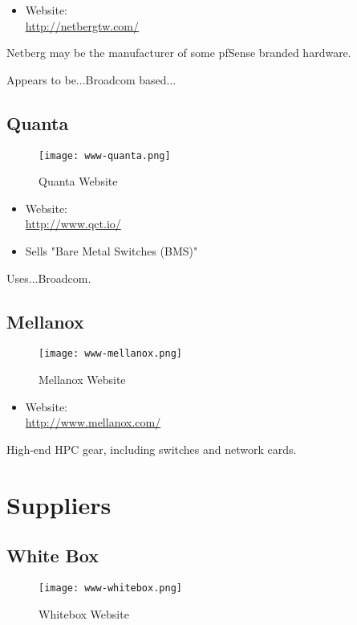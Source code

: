\begin{itemize}
 \item Website: \\ \url{http://netbergtw.com/}
\end{itemize}


Netberg may be the manufacturer of some pfSense branded hardware.


Appears to be...Broadcom based...


\subsection{Quanta}
\begin{figure}[h!]
\texttt{[image: www-quanta.png]}
 \caption{Quanta Website}
 \label{fig:www-quanta}
\end{figure}


\begin{itemize}
 \item Website: \\ \url{http://www.qct.io/}
 \item Sells "Bare Metal Switches (BMS)"
\end{itemize}


Uses...Broadcom.


\subsection{Mellanox}
\begin{figure}[h!]
\texttt{[image: www-mellanox.png]}
 \caption{Mellanox Website}
 \label{fig:www-mellanox}
\end{figure}


\begin{itemize}
 \item Website: \\ \url{http://www.mellanox.com/}
\end{itemize}


High-end HPC gear, including switches and network cards.


\section{Suppliers}

\subsection{White Box}
\begin{figure}[h!]
\texttt{[image: www-whitebox.png]}
 \caption{Whitebox Website}
 \label{fig:www-whitebox}
\end{figure}


